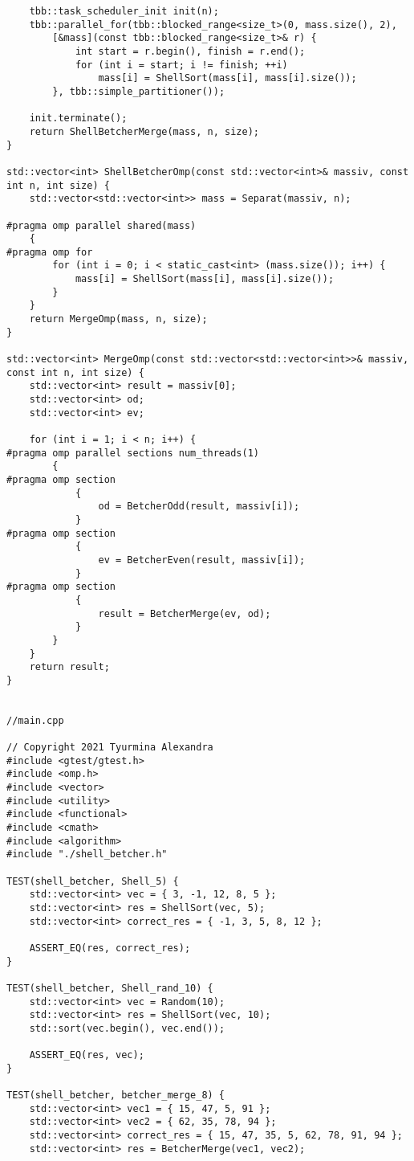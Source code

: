 \documentclass{report}
\begin{document}
\begin{lstlisting}
    tbb::task_scheduler_init init(n); 
    tbb::parallel_for(tbb::blocked_range<size_t>(0, mass.size(), 2), 
        [&mass](const tbb::blocked_range<size_t>& r) {
            int start = r.begin(), finish = r.end();
            for (int i = start; i != finish; ++i)
                mass[i] = ShellSort(mass[i], mass[i].size());
        }, tbb::simple_partitioner()); 

    init.terminate(); 
    return ShellBetcherMerge(mass, n, size);
}

std::vector<int> ShellBetcherOmp(const std::vector<int>& massiv, const int n, int size) {
    std::vector<std::vector<int>> mass = Separat(massiv, n);

#pragma omp parallel shared(mass)
    {
#pragma omp for
        for (int i = 0; i < static_cast<int> (mass.size()); i++) {
            mass[i] = ShellSort(mass[i], mass[i].size());
        }
    }
    return MergeOmp(mass, n, size);
}

std::vector<int> MergeOmp(const std::vector<std::vector<int>>& massiv, const int n, int size) {
    std::vector<int> result = massiv[0];
    std::vector<int> od;
    std::vector<int> ev;

    for (int i = 1; i < n; i++) {
#pragma omp parallel sections num_threads(1)
        {
#pragma omp section
            {
                od = BetcherOdd(result, massiv[i]);
            }
#pragma omp section
            {
                ev = BetcherEven(result, massiv[i]);
            }
#pragma omp section
            {
                result = BetcherMerge(ev, od);
            }
        }
    }
    return result;
}


//main.cpp

// Copyright 2021 Tyurmina Alexandra
#include <gtest/gtest.h>
#include <omp.h>
#include <vector>
#include <utility>
#include <functional>
#include <cmath>
#include <algorithm>
#include "./shell_betcher.h"

TEST(shell_betcher, Shell_5) {
    std::vector<int> vec = { 3, -1, 12, 8, 5 };
    std::vector<int> res = ShellSort(vec, 5);
    std::vector<int> correct_res = { -1, 3, 5, 8, 12 };

    ASSERT_EQ(res, correct_res);
}

TEST(shell_betcher, Shell_rand_10) {
    std::vector<int> vec = Random(10);
    std::vector<int> res = ShellSort(vec, 10);
    std::sort(vec.begin(), vec.end());

    ASSERT_EQ(res, vec);
}

TEST(shell_betcher, betcher_merge_8) {
    std::vector<int> vec1 = { 15, 47, 5, 91 };
    std::vector<int> vec2 = { 62, 35, 78, 94 };
    std::vector<int> correct_res = { 15, 47, 35, 5, 62, 78, 91, 94 };
    std::vector<int> res = BetcherMerge(vec1, vec2);


\end{lstlisting}
\end{document}

